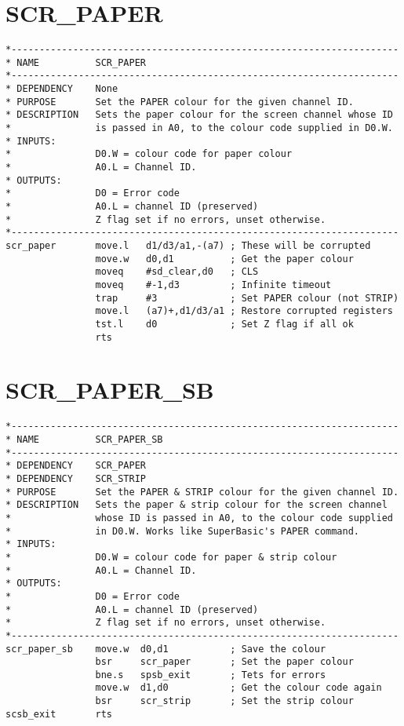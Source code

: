 \section{SCR\_PAPER}
\label{ch9-SCR_PAPER}%

\begin{lstlisting}[firstnumber=1,caption={SCR\_PAPER}]
*---------------------------------------------------------------------
* NAME          SCR_PAPER
*---------------------------------------------------------------------
* DEPENDENCY    None
* PURPOSE       Set the PAPER colour for the given channel ID.
* DESCRIPTION   Sets the paper colour for the screen channel whose ID 
*               is passed in A0, to the colour code supplied in D0.W.
* INPUTS:
*               D0.W = colour code for paper colour
*               A0.L = Channel ID.
* OUTPUTS:
*               D0 = Error code
*               A0.L = channel ID (preserved)
*               Z flag set if no errors, unset otherwise.
*---------------------------------------------------------------------
scr_paper       move.l   d1/d3/a1,-(a7) ; These will be corrupted
                move.w   d0,d1          ; Get the paper colour
                moveq    #sd_clear,d0   ; CLS
                moveq    #-1,d3         ; Infinite timeout
                trap     #3             ; Set PAPER colour (not STRIP)
                move.l   (a7)+,d1/d3/a1 ; Restore corrupted registers
                tst.l    d0             ; Set Z flag if all ok
                rts
\end{lstlisting}

\section{SCR\_PAPER\_SB}
\label{ch9-SCR_PAPER_SB}%

\begin{lstlisting}[firstnumber=1,caption={SCR\_PAPER\_SB}]
*---------------------------------------------------------------------
* NAME          SCR_PAPER_SB
*---------------------------------------------------------------------
* DEPENDENCY    SCR_PAPER
* DEPENDENCY    SCR_STRIP
* PURPOSE       Set the PAPER & STRIP colour for the given channel ID.
* DESCRIPTION   Sets the paper & strip colour for the screen channel 
*               whose ID is passed in A0, to the colour code supplied 
*               in D0.W. Works like SuperBasic's PAPER command.
* INPUTS:
*               D0.W = colour code for paper & strip colour
*               A0.L = Channel ID.
* OUTPUTS:
*               D0 = Error code
*               A0.L = channel ID (preserved)
*               Z flag set if no errors, unset otherwise.
*---------------------------------------------------------------------
scr_paper_sb    move.w  d0,d1           ; Save the colour 
                bsr     scr_paper       ; Set the paper colour
                bne.s   spsb_exit       ; Tets for errors
                move.w  d1,d0           ; Get the colour code again
                bsr     scr_strip       ; Set the strip colour
scsb_exit       rts
\end{lstlisting}

